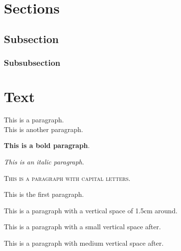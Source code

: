 

\startcontents
{}

\newpage



\section{Sections}\label{section:section_1}
\subsection{Subsection}
\subsubsection{Subsubsection}

\lipsum

\newpage


\section{Text}

This is a paragraph.\\This is another paragraph.

\textbf{This is a bold paragraph}.

\textit{This is an italic paragraph}.

\textsc{This is a paragraph with capital letters.}

\newpage

This is the first paragraph.

\vspace{1.5cm}
This is a paragraph with a vertical space of 1.5cm around.
\vspace{1.5cm}

This is a paragraph with a small vertical space after.

\smallbreak

This is a paragraph with medium vertical space after.

\medbreak


